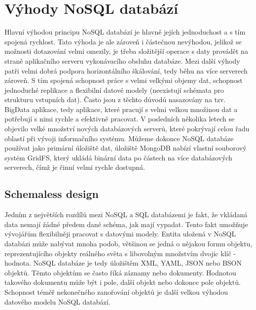 \section{Výhody NoSQL databází}
Hlavní výhodou principu NoSQL databází je hlavně jejích jednoduchost a s tím spojená rychlost. Tato výhoda je ale zároveň i částečnou nevýhodou, jelikož se možnosti dotazování velmi omezily, je třeba složitější operace s daty provádět na straně aplikačního serveru vykonávacího obsluhu databáze. 
Mezi další výhody patři velmi dobrá podpora horizontálního škálování, tedy běhu na více serverech zároveň. S tím spojená schopnost práce s velmi velkými objemy dat, schopnost jednoduché replikace a flexibilní datové modely (neexistují schémata pro strukturu vstupních dat). Často jsou z těchto důvodů nasazovány na tzv. BigData aplikace, tedy aplikace, které pracují s velmi velkou množinou dat a potřebují s nimi rychle a efektivně pracovat. V posledních několika letech se objevilo velké množství nových databázových serverů, které pokrývají celou řadu oblastí při vývoji informačního systému. Můžeme dokonce NoSQL databáze používat jako primární úložiště dat, úložiště MongoDB nabízí vlastní souborový systém GridFS, který ukládá binární data po částech na více databázových serverech, čímž je činní velmi rychle dostupná. \cite{mongoDocs}

\subsection{Schemaless design}
Jedním z největších rozdílů mezi NoSQL a SQL databázemi je fakt, že vkládaná data nemají žádné předem dané schéma, jak mají vypadat. Tento fakt umožňuje vývojářům flexibilněji pracovat s datovými modely. Entita uložená v NoSQL databázi může nabývat mnoha podob, většinou se jedná o nějakou formu objektu, reprezentujícího objekty reálného světa s libovolným množstvím dvojic klíč - hodnota. NoSQL databáze je tedy úložištěm XML, YAML, JSON nebo BSON objektů. Těmto objektům se často říká záznamy nebo dokumenty. Hodnotou takového dokumentu může být i pole, další objekt nebo dokonce pole objektů. Schopnost téměř nekonečného zanořování objektů je další velkou výhodou datového modelu NoSQL databází.

